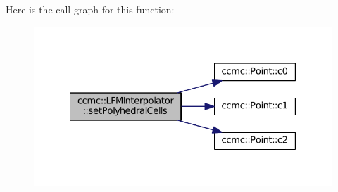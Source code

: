 Here is the call graph for this function\-:\nopagebreak
\begin{figure}[H]
\begin{center}
\leavevmode
\includegraphics[width=328pt]{classccmc_1_1_l_f_m_interpolator_a74c1ba35f8eaece3f44393538c23300d_cgraph}
\end{center}
\end{figure}





